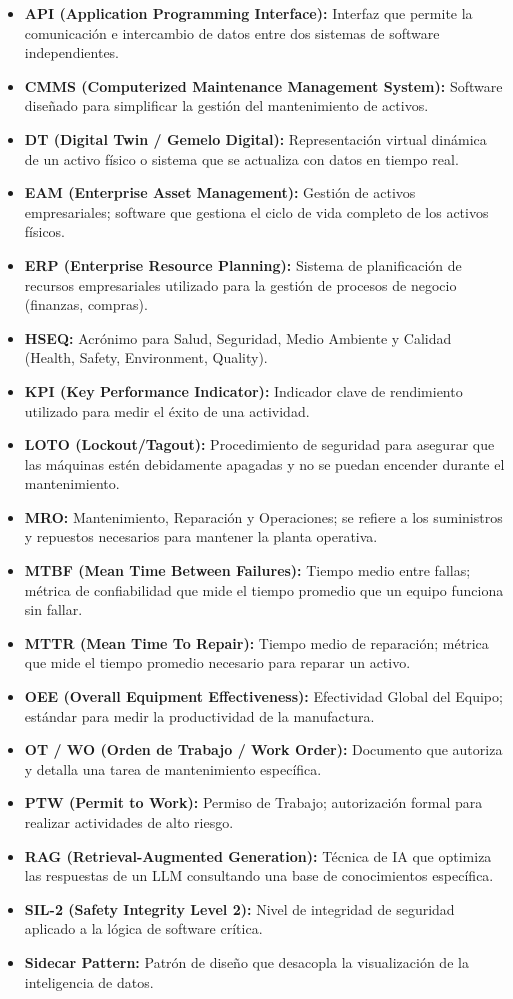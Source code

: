 \begin{itemize}
    \item \textbf{API (Application Programming Interface):} Interfaz que permite la comunicación e intercambio de datos entre dos sistemas de software independientes.
    \item \textbf{CMMS (Computerized Maintenance Management System):} Software diseñado para simplificar la gestión del mantenimiento de activos.
    \item \textbf{DT (Digital Twin / Gemelo Digital):} Representación virtual dinámica de un activo físico o sistema que se actualiza con datos en tiempo real.
    \item \textbf{EAM (Enterprise Asset Management):} Gestión de activos empresariales; software que gestiona el ciclo de vida completo de los activos físicos.
    \item \textbf{ERP (Enterprise Resource Planning):} Sistema de planificación de recursos empresariales utilizado para la gestión de procesos de negocio (finanzas, compras).
    \item \textbf{HSEQ:} Acrónimo para Salud, Seguridad, Medio Ambiente y Calidad (Health, Safety, Environment, Quality).
    \item \textbf{KPI (Key Performance Indicator):} Indicador clave de rendimiento utilizado para medir el éxito de una actividad.
    \item \textbf{LOTO (Lockout/Tagout):} Procedimiento de seguridad para asegurar que las máquinas estén debidamente apagadas y no se puedan encender durante el mantenimiento.
    \item \textbf{MRO:} Mantenimiento, Reparación y Operaciones; se refiere a los suministros y repuestos necesarios para mantener la planta operativa.
    \item \textbf{MTBF (Mean Time Between Failures):} Tiempo medio entre fallas; métrica de confiabilidad que mide el tiempo promedio que un equipo funciona sin fallar.
    \item \textbf{MTTR (Mean Time To Repair):} Tiempo medio de reparación; métrica que mide el tiempo promedio necesario para reparar un activo.
    \item \textbf{OEE (Overall Equipment Effectiveness):} Efectividad Global del Equipo; estándar para medir la productividad de la manufactura.
    \item \textbf{OT / WO (Orden de Trabajo / Work Order):} Documento que autoriza y detalla una tarea de mantenimiento específica.
    \item \textbf{PTW (Permit to Work):} Permiso de Trabajo; autorización formal para realizar actividades de alto riesgo.
    \item \textbf{RAG (Retrieval-Augmented Generation):} Técnica de IA que optimiza las respuestas de un LLM consultando una base de conocimientos específica.
    \item \textbf{SIL-2 (Safety Integrity Level 2):} Nivel de integridad de seguridad aplicado a la lógica de software crítica.
    \item \textbf{Sidecar Pattern:} Patrón de diseño que desacopla la visualización de la inteligencia de datos.
\end{itemize}
